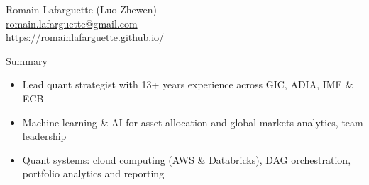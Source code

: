 \documentclass[usegeometry, 10pt, a4paper]{cv} %
\begin{document}
\hspace{10mm}
\begin{chapeau}
\begin{adresse}
\begin{flushleft}
    Romain Lafarguette (Luo Zhewen)\\
    \href{mailto:romain.lafarguette@gmail.com}{romain.lafarguette@gmail.com}\\
    \url{https://romainlafarguette.github.io/} \\
\end{flushleft}
\end{adresse}
\end{chapeau}

\vspace{-0.5cm}

\begin{rubriquetableau}[0.95\textwidth]{Summary}\\
  \vspace{-1cm}
  \begin{itemize}
  \item Lead quant strategist with 13+ years experience across GIC, ADIA, IMF \& ECB 
  \item Machine learning \& AI for asset allocation and global markets analytics, team leadership
  \item Quant systems: cloud computing (AWS \& Databricks), DAG orchestration, portfolio analytics and reporting  
  \end{itemize}

\end{rubriquetableau}

\vspace{0.2cm}

\end{document}
